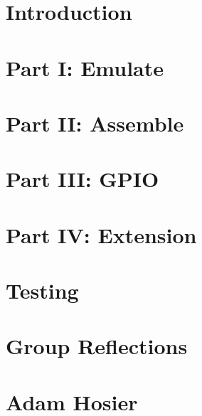 \documentclass[11pt]{article}
\begin{document}


\vspace{-50mm}
\maketitle

\section{Introduction}



\section{Part I: Emulate}



\section{Part II: Assemble}
  


\section{Part III: GPIO}


  
\section{Part IV: Extension}



\section{Testing}



\section{Group Reflections}



\section{Adam Hosier}


\end{document}
